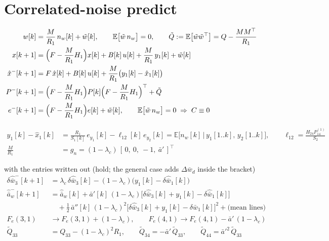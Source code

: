 \documentclass[11pt,a4paper,fontset=none]{ctexart}
\newcommand{\ba}{\bar{a}}
\newcommand{\bw}{\bar{w}}
\newcommand{\E}{\mathbb{E}}
\begin{document}
\section{Correlated-noise predict}

\begin{align*}
w[k] &= \frac{M}{R_1}\,n_w[k] + \tilde{w}[k] , \qquad
\E\bigl[\tilde{w}\,n_w\bigr] = 0 , \qquad
\tilde{Q} := \E\bigl[\tilde{w}\tilde{w}^{\top}\bigr] = Q - \frac{MM^{\top}}{R_1} \\
x[k+1] &= \Bigl(F - \frac{M}{R_1}H_1\Bigr)x[k] + B[k]\,u[k] + \frac{M}{R_1}\,y_1[k] + \tilde{w}[k] \\
\hat{x}^{-}[k+1] &= F\,\hat{x}[k] + B[k]\,u[k] + \frac{M}{R_1}\bigl(y_1[k] - \hat{x}_1[k]\bigr) \\
P^{-}[k+1] &= \Bigl(F - \frac{M}{R_1}H_1\Bigr)P[k]\Bigl(F - \frac{M}{R_1}H_1\Bigr)^{\top} + \tilde{Q} \\
e^{-}[k+1] &= \Bigl(F - \frac{M}{R_1}H_1\Bigr)e[k] + \tilde{w}[k] , \qquad \E\bigl[\tilde{w}\,n_w\bigr] = 0
   \;\Rightarrow\; C \equiv 0
\end{align*}

\begin{align*}
y_1[k] - \hat{x}_1[k] &= \frac{R_1}{S_1[k]}\,e_{y_1}[k] - \ell_{12}[k]\,e_{y_2}[k]
   = \E\bigl[n_w[k]\,\big|\,y_1[1..k],\,y_2[1..k]\bigr] , \qquad \ell_{12} = \frac{H_{24}P^{(1)}_{14}}{S_2} \\
\frac{M}{R_1} &= g_n = (1-\lambda_c)\,[\,0,\ 0,\ -1,\ \ba'\,]^{\top}
\end{align*}

with the entries written out (hold; the general case adds $\Delta\bw_d$ inside the bracket)
\begin{align*}
\delta\hat{\bw}_3^{-}[k+1] &= \lambda_c\,\delta\hat{\bw}_3[k] - (1-\lambda_c)\bigl(y_1[k] - \delta\hat{\bw}_1[k]\bigr) \\
\hat{\ba}_w^{-}[k+1] &= \hat{\ba}_w[k]
  + \ba'[k]\,(1-\lambda_c)\bigl[\delta\hat{\bw}_3[k] + y_1[k] - \delta\hat{\bw}_1[k]\bigr] \\
  &\quad + \tfrac{1}{2}\,\ba''[k]\,(1-\lambda_c)^{2}\bigl[\delta\hat{\bw}_3[k] + y_1[k] - \delta\hat{\bw}_1[k]\bigr]^{2}
  + \text{(mean lines)} \\
F_e(3,1) &\to F_e(3,1) + (1-\lambda_c) , \qquad F_e(4,1) \to F_e(4,1) - \ba'\,(1-\lambda_c) \\
\tilde{Q}_{33} &= Q_{33} - (1-\lambda_c)^{2}R_1 , \qquad
\tilde{Q}_{34} = -\ba'\,\tilde{Q}_{33} , \qquad \tilde{Q}_{44} = \ba'^{2}\,\tilde{Q}_{33}
\end{align*}
\end{document}
